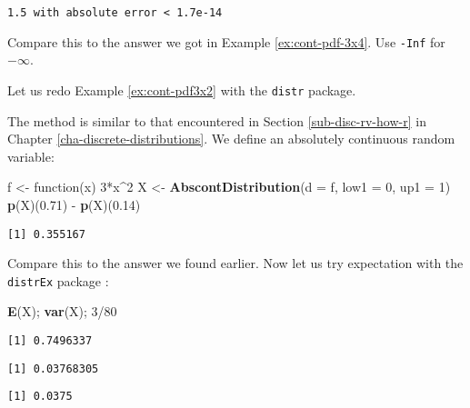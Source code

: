 \documentclass[]{book}
\newenvironment{Shaded}{\begin{snugshade}}{\end{snugshade}}
\newcommand{\KeywordTok}[1]{\textcolor[rgb]{0.13,0.29,0.53}{\textbf{{#1}}}}
\newcommand{\DataTypeTok}[1]{\textcolor[rgb]{0.13,0.29,0.53}{{#1}}}
\newcommand{\DecValTok}[1]{\textcolor[rgb]{0.00,0.00,0.81}{{#1}}}
\newcommand{\FloatTok}[1]{\textcolor[rgb]{0.00,0.00,0.81}{{#1}}}
\newcommand{\StringTok}[1]{\textcolor[rgb]{0.31,0.60,0.02}{{#1}}}
\newcommand{\NormalTok}[1]{{#1}}
\numberwithin{equation}{chapter}
\numberwithin{figure}{chapter}
\theoremstyle{plain}
\theoremstyle{definition}
\theoremstyle{remark}
\theoremstyle{definition}
\theoremstyle{definition}
\theoremstyle{remark}
\let\BeginKnitrBlock\begin \let\EndKnitrBlock\end
\begin{document}
\begin{verbatim}
1.5 with absolute error < 1.7e-14
\end{verbatim}

Compare this to the answer we got in Example \ref{ex:cont-pdf-3x4}. Use
\texttt{-Inf} for \(-\infty\).

\bigskip

\BeginKnitrBlock{example}
\protect\hypertarget{ex:unnamed-chunk-261}{}{\label{ex:unnamed-chunk-261}}Let
us redo Example \ref{ex:cont-pdf3x2} with the \texttt{distr} package.
\EndKnitrBlock{example}

The method is similar to that encountered in Section
\ref{sub-disc-rv-how-r} in Chapter \ref{cha-discrete-distributions}. We
define an absolutely continuous random variable:

\begin{Shaded}
\begin{Highlighting}[]
\NormalTok{f <-}\StringTok{ }\NormalTok{function(x) }\DecValTok{3}\NormalTok{*x^}\DecValTok{2}
\NormalTok{X <-}\StringTok{ }\KeywordTok{AbscontDistribution}\NormalTok{(}\DataTypeTok{d =} \NormalTok{f, }\DataTypeTok{low1 =} \DecValTok{0}\NormalTok{, }\DataTypeTok{up1 =} \DecValTok{1}\NormalTok{)}
\KeywordTok{p}\NormalTok{(X)(}\FloatTok{0.71}\NormalTok{) -}\StringTok{ }\KeywordTok{p}\NormalTok{(X)(}\FloatTok{0.14}\NormalTok{)}
\end{Highlighting}
\end{Shaded}

\begin{verbatim}
[1] 0.355167
\end{verbatim}

Compare this to the answer we found earlier. Now let us try expectation
with the \texttt{distrEx} package \autocite{distrEx}:

\begin{Shaded}
\begin{Highlighting}[]
\KeywordTok{E}\NormalTok{(X); }\KeywordTok{var}\NormalTok{(X); }\DecValTok{3}\NormalTok{/}\DecValTok{80}
\end{Highlighting}
\end{Shaded}

\begin{verbatim}
[1] 0.7496337
\end{verbatim}

\begin{verbatim}
[1] 0.03768305
\end{verbatim}

\begin{verbatim}
[1] 0.0375
\end{verbatim}
\end{document}
